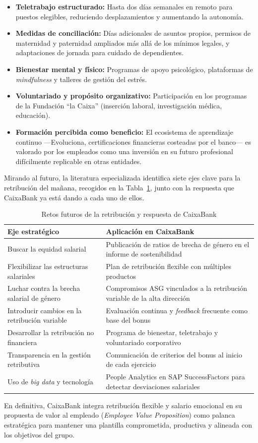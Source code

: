 \begin{itemize}
    \item \textbf{Teletrabajo estructurado:} Hasta dos días semanales en remoto para puestos elegibles, reduciendo desplazamientos y aumentando la autonomía.
    \item \textbf{Medidas de conciliación:} Días adicionales de asuntos propios, permisos de maternidad y paternidad ampliados más allá de los mínimos legales, y adaptaciones de jornada para cuidado de dependientes.
    \item \textbf{Bienestar mental y físico:} Programas de apoyo psicológico, plataformas de \textit{mindfulness} y talleres de gestión del estrés.
    \item \textbf{Voluntariado y propósito organizativo:} Participación en los programas de la Fundación ``la Caixa'' (inserción laboral, investigación médica, educación).
    \item \textbf{Formación percibida como beneficio:} El ecosistema de aprendizaje continuo —Evoluciona, certificaciones financieras costeadas por el banco— es valorado por los empleados como una inversión en su futuro profesional difícilmente replicable en otras entidades.
\end{itemize}

Mirando al futuro, la literatura especializada identifica siete ejes clave para la retribución del mañana, recogidos en la Tabla~\ref{tab:futuro-retribucion}, junto con la respuesta que CaixaBank ya está dando a cada uno de ellos.

\begin{table}[H]
\centering
\caption{Retos futuros de la retribución y respuesta de CaixaBank}
\label{tab:futuro-retribucion}
\small
\begin{tabularx}{\textwidth}{|X|X|}
\hline
\textbf{Eje estratégico} & \textbf{Aplicación en CaixaBank} \\
\hline
Buscar la equidad salarial & Publicación de ratios de brecha de género en el informe de sostenibilidad \\
\hline
Flexibilizar las estructuras salariales & Plan de retribución flexible con múltiples productos \\
\hline
Luchar contra la brecha salarial de género & Compromisos ASG vinculados a la retribución variable de la alta dirección \\
\hline
Introducir cambios en la retribución variable & Evaluación continua y \textit{feedback} frecuente como base del bonus \\
\hline
Desarrollar la retribución no financiera & Programa de bienestar, teletrabajo y voluntariado corporativo \\
\hline
Transparencia en la gestión retributiva & Comunicación de criterios del bonus al inicio de cada ejercicio \\
\hline
Uso de \textit{big data} y tecnología & People Analytics en SAP SuccessFactors para detectar desviaciones salariales \\
\hline
\end{tabularx}
\end{table}

En definitiva, CaixaBank integra retribución flexible y salario emocional en su propuesta de valor al empleado (\textit{Employee Value Proposition}) como palanca estratégica para mantener una plantilla comprometida, productiva y alineada con los objetivos del grupo.
